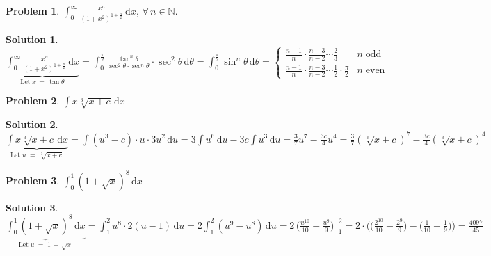 \documentclass[11pt,a4paper]{article}
\newcommand{\ds}{\displaystyle}
\theoremstyle{definition}
\newtheorem*{problem}{Problem}
\newtheorem*{solution}{Solution}
\begin{document}
%
%

\begin{problem}
  $\ds\int_0^\infty\!\frac{x^n}{(1 + x^2)^{1 + \frac{n}{2}}}\,\text{d}x$, $\forall\,n\in\mathbb{N}$.
\end{problem}

\begin{solution}
  $\ds\underbrace{\int_0^\infty\!\frac{x^n}{(1 + x^2)^{1 + \frac{n}{2}}}\,\text{d}x}_{\text{Let}\; x\,=\,\tan\theta} = \int_0^{\frac{\pi}{2}}\!\frac{\tan^n\!\theta}{\sec^2\!\theta\cdot\sec^n\!\theta}\cdot\sec^2\!\theta\,\text{d}\theta = \int_0^{\frac{\pi}{2}}\!\sin^n\!\theta\,\text{d}\theta = \begin{cases}\frac{n - 1}{n}\cdot\frac{n - 3}{n - 2}\cdots\frac{2}{3} & n\;\text{odd} \\ \frac{n - 1}{n}\cdot\frac{n - 3}{n - 2}\cdots\frac{1}{2}\cdot\frac{\pi}{2} & n\;\text{even}\end{cases}$
\end{solution}

\begin{problem}
  $\ds\int\!x \sqrt[3]{x + c}\,\text{d}x$
\end{problem}

\begin{solution}
  $\ds\underbrace{\int\!x\sqrt[3]{x + c}\,\text{d}x}_{\text{Let}\; u\;=\;\sqrt[3]{x + c}} = \int\!(u^3 - c)\cdot u\cdot 3u^2\,\text{d}u = 3\int\!u^6\,\text{d}u - 3c\int\!u^3\,\text{d}u = \frac{3}{7}u^7 - \frac{3c}{4}u^4 = \frac{3}{7}(\sqrt[3]{x + c})^7 - \frac{3c}{4}(\sqrt[3]{x + c})^4$
\end{solution}

\begin{problem}
  $\ds\int_0^1(1 + \sqrt{x})^8\,\text{d}x$
\end{problem}

\begin{solution}
  $\ds\underbrace{\int_0^1\!(1 + \sqrt{x})^8\,\text{d}x}_{\text{Let}\; u\;=\;1\,+\,\sqrt{x}} = \int_1^2\!u^8\cdot 2(u - 1)\,\text{d}u = 2\int_1^2\!(u^9 - u^8)\,\text{d}u = 2\,\Big(\frac{u^{10}}{10} - \frac{u^9}{9}\Big)\,\Big|_1^2 = 2\cdot\Big(\Big(\frac{2^{10}}{10} - \frac{2^9}{9}\Big) - \Big(\frac{1}{10} - \frac{1}{9}\Big)\Big) = \frac{4097}{45}$
\end{solution}
\end{document}
